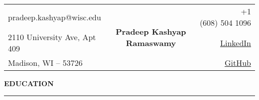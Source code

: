 \documentclass[a4paper, 10pt]{extarticle}
\author{Pradeep Kashyap Ramaswamy}
\date{December 2016}
\begin{document}
{\begin{center}
\begin{tabular}{l c r}
    pradeep.kashyap@wisc.edu  & \multirow{3}{*}{\LARGE{\textbf{ Pradeep Kashyap Ramaswamy}}} & \ \ \ \ \ \ +1 (608) 504 1096 \\
     2110 University Ave, Apt 409 & & \href{https://www.linkedin.com/in/pradeep-kashyap-ramaswamy}{LinkedIn} \\
     Madison, WI -- 53726 & & \href{https://github.com/pradeep0605}{GitHub}\\
\end{tabular}
\end{center}}


\begin{flushleft}
{\LARGE{\textbf{E}}\Large{\textbf{DUCATION}}}
\end{flushleft}
\vspace{-0.1cm}\hrule \vspace{.1cm}
\end{document}
